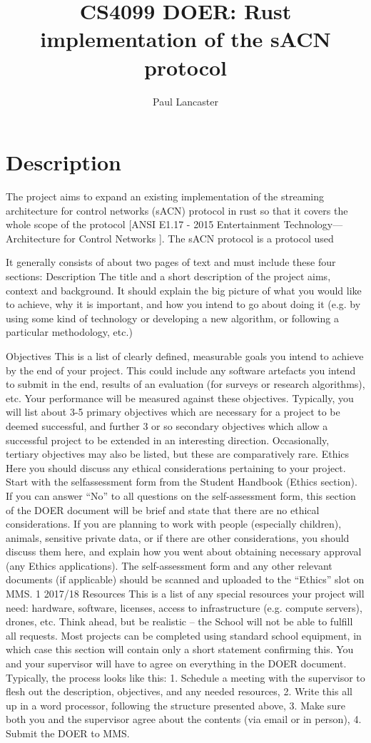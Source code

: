\documentclass[12pt,a4paper,notitlepage]{report}
\author{Paul Lancaster}
\title{CS4099 DOER: Rust implementation of the sACN protocol}
\begin{document}
	\maketitle
	\section*{Description}
	The project aims to expand an existing implementation of the streaming architecture for control networks (sACN) protocol in rust so that it covers the whole scope of the protocol [ANSI E1.17 - 2015 Entertainment Technology—Architecture for Control Networks ]. The sACN protocol is a protocol used 
	
	
	
	
 It
generally consists of about two pages of text and must include these four sections:
Description
The title and a short description of the project aims,
context and background. It should explain the big
picture of what you would like to achieve, why it is
important, and how you intend to go about doing it (e.g.
by using some kind of technology or developing a new
algorithm, or following a particular methodology, etc.)

Objectives
This is a list of clearly defined, measurable goals you
intend to achieve by the end of your project. This could
include any software artefacts you intend to submit in
the end, results of an evaluation (for surveys or research
algorithms), etc. Your performance will be measured
against these objectives.
Typically, you will list about 3-5 primary objectives
which are necessary for a project to be deemed
successful, and further 3 or so secondary objectives
which allow a successful project to be extended in an
interesting direction. Occasionally, tertiary objectives
may also be listed, but these are comparatively rare.
Ethics
Here you should discuss any ethical considerations
pertaining to your project. Start with the selfassessment form from the Student Handbook (Ethics
section). If you can answer “No” to all questions on the
self-assessment form, this section of the DOER
document will be brief and state that there are no ethical
considerations.
If you are planning to work with people (especially
children), animals, sensitive private data, or if there are
other considerations, you should discuss them here, and
explain how you went about obtaining necessary
approval (any Ethics applications).
The self-assessment form and any other relevant
documents (if applicable) should be scanned and
uploaded to the “Ethics” slot on MMS.
1
2017/18
Resources
This is a list of any special resources your project will
need: hardware, software, licenses, access to
infrastructure (e.g. compute servers), drones, etc. Think
ahead, but be realistic -- the School will not be able to
fulfill all requests.
Most projects can be completed using standard school
equipment, in which case this section will contain only a
short statement confirming this.
You and your supervisor will have to agree on everything in the DOER document.
Typically, the process looks like this:
1. Schedule a meeting with the supervisor to flesh out the description,
objectives, and any needed resources,
2. Write this all up in a word processor, following the structure presented
above,
3. Make sure both you and the supervisor agree about the contents (via email
or in person),
4. Submit the DOER to MMS.
\end{document}

